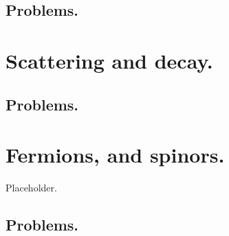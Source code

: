       \section{Problems.}
         
         
         
         
         
         
         
   \chapter{Scattering and decay.}
      
      
      
      \section{Problems.}
         
         
         
   \chapter{Fermions, and spinors.}
      Placeholder.
      \section{Problems.}
         
